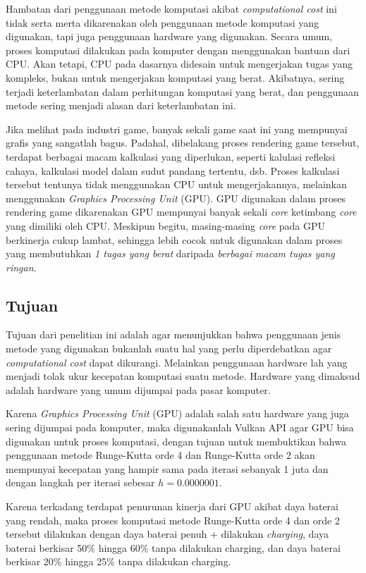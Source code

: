 Hambatan dari penggunaan metode komputasi akibat \emph{computational
	cost} ini tidak serta merta dikarenakan oleh penggunaan metode komputasi
yang digunakan, tapi juga penggunaan hardware yang digunakan. Secara
umum, proses komputasi dilakukan pada komputer dengan menggunakan
bantuan dari CPU. Akan tetapi, CPU pada dasarnya didesain untuk
mengerjakan tugas yang kompleks, bukan untuk mengerjakan komputasi yang
berat. Akibatnya, sering terjadi keterlambatan dalam perhitungan
komputasi yang berat, dan penggunaan metode sering menjadi alasan dari
keterlambatan ini.

Jika melihat pada industri game, banyak sekali game saat ini yang
mempunyai grafis yang sangatlah bagus. Padahal, dibelakang proses
rendering game tersebut, terdapat berbagai macam kalkulasi yang
diperlukan, seperti kalulasi refleksi cahaya, kalkulasi model dalam
sudut pandang tertentu, dsb. Proses kalkulasi tersebut tentunya tidak
menggunakan CPU untuk mengerjakannya, melainkan menggunakan
\emph{Graphics Processing Unit} (GPU). GPU digunakan dalam proses
rendering game dikarenakan GPU mempunyai banyak sekali \emph{core}
ketimbang \emph{core} yang dimiliki oleh CPU. Meskipun begitu,
masing-masing \emph{core} pada GPU berkinerja cukup lambat, sehingga
lebih cocok untuk digunakan dalam proses yang membutuhkan \emph{1 tugas
	yang berat} daripada \emph{berbagai macam tugas yang ringan}.

\hypertarget{tujuan}{%
	\subsection{Tujuan}\label{tujuan}}

Tujuan dari penelitian ini adalah agar menunjukkan bahwa penggunaan
jenis metode yang digunakan bukanlah suatu hal yang perlu diperdebatkan
agar \emph{computational cost} dapat dikurangi. Melainkan penggunaan
hardware lah yang menjadi tolak ukur kecepatan komputasi suatu metode.
Hardware yang dimaksud adalah hardware yang umum dijumpai pada pasar
komputer.

Karena \emph{Graphics Processing Unit} (GPU) adalah salah satu
hardware yang juga sering dijumpai pada komputer, maka digunakanlah
Vulkan API agar GPU bisa digunakan untuk proses komputasi, dengan tujuan
untuk membuktikan bahwa penggunaan metode Runge-Kutta orde 4 dan
Runge-Kutta orde 2 akan mempunyai kecepatan yang hampir sama pada
iterasi sebanyak 1 juta dan dengan langkah per iterasi sebesar
\(h = 0.0000001\).

Karena terkadang terdapat penurunan kinerja dari GPU akibat daya
baterai yang rendah, maka proses komputasi metode Runge-Kutta orde 4 dan
orde 2 tersebut dilakukan dengan daya baterai penuh + dilakukan
\emph{charging}, daya baterai berkisar 50\% hingga 60\% tanpa dilakukan
charging, dan daya baterai berkisar 20\% hingga 25\% tanpa dilakukan
charging.

